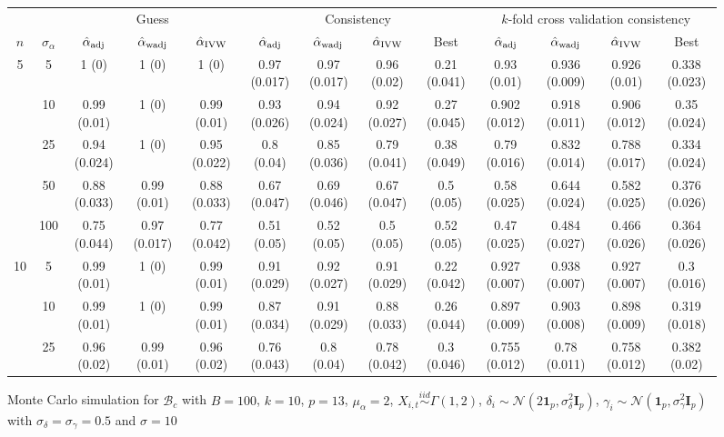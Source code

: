 \documentclass[10pt]{article}
\newcommand{\simiid}{\stackrel{iid}{\sim}} %
\def\normal#1#2{\mathcal{N}(#1,#2)} %
\def\mc#1{\mathcal{#1}} %
\theoremstyle{definition}
\begin{document}
\begin{sidewaysfigure}
\centering
\caption{Monte Carlo simulation for $\mc{B}_c$  with $B = 100$, $k = 10$, $p = 13$, $\mu_{\alpha}=2$, $X_{i,t} \simiid \Gamma(1,2)$, $\delta_i \sim \normal{2\mathbf{1}_p}{\sigma^2_{\delta}\mathbf{I}_p}$, $\gamma_i \sim \normal{\mathbf{1}_p}{\sigma^2_{\gamma}\mathbf{I}_p}$ with $\sigma_{\delta}=\sigma_{\gamma}=0.5$ and $\sigma = 10$}
\begin{tabular}{cc|ccc|cccc|cccc}
   &   & \multicolumn{3}{|c|}{Guess} & \multicolumn{4}{|c|}{Consistency}  & \multicolumn{4}{|c|}{$k$-fold cross validation consistency} \\ 
 $n$   & $\sigma_{\alpha}$ &  $\hat{\alpha}_{\rm adj}$  & $\hat{\alpha}_{\rm wadj}$ & $\hat{\alpha}_{\rm IVW}$ & $\hat{\alpha}_{\rm adj}$  & $\hat{\alpha}_{\rm wadj}$ & $\hat{\alpha}_{\rm IVW}$ &  Best & $\hat{\alpha}_{\rm adj}$  & $\hat{\alpha}_{\rm wadj}$ & $\hat{\alpha}_{\rm IVW}$ &  Best \\[.3cm]  
  \hline
  \multirow{5}{*}{5}  & 5  & 1 (0) & 1 (0) & 1 (0) & 0.97 (0.017) & 0.97 (0.017) & 0.96 (0.02) & 0.21 (0.041) & 0.93 (0.01) & 0.936 (0.009) & 0.926 (0.01) & 0.338 (0.023) \\ 
    & 10  & 0.99 (0.01) & 1 (0) & 0.99 (0.01) & 0.93 (0.026) & 0.94 (0.024) & 0.92 (0.027) & 0.27 (0.045) & 0.902 (0.012) & 0.918 (0.011) & 0.906 (0.012) & 0.35 (0.024) \\ 
    & 25  & 0.94 (0.024) & 1 (0) & 0.95 (0.022) & 0.8 (0.04) & 0.85 (0.036) & 0.79 (0.041) & 0.38 (0.049) & 0.79 (0.016) & 0.832 (0.014) & 0.788 (0.017) & 0.334 (0.024) \\ 
    & 50  & 0.88 (0.033) & 0.99 (0.01) & 0.88 (0.033) & 0.67 (0.047) & 0.69 (0.046) & 0.67 (0.047) & 0.5 (0.05) & 0.58 (0.025) & 0.644 (0.024) & 0.582 (0.025) & 0.376 (0.026) \\ 
    & 100  & 0.75 (0.044) & 0.97 (0.017) & 0.77 (0.042) & 0.51 (0.05) & 0.52 (0.05) & 0.5 (0.05) & 0.52 (0.05) & 0.47 (0.025) & 0.484 (0.027) & 0.466 (0.026) & 0.364 (0.026) \\[.3cm]  
    \multirow{5}{*}{10}  & 5  & 0.99 (0.01) & 1 (0) & 0.99 (0.01) & 0.91 (0.029) & 0.92 (0.027) & 0.91 (0.029) & 0.22 (0.042) & 0.927 (0.007) & 0.938 (0.007) & 0.927 (0.007) & 0.3 (0.016) \\ 
    & 10  & 0.99 (0.01) & 1 (0) & 0.99 (0.01) & 0.87 (0.034) & 0.91 (0.029) & 0.88 (0.033) & 0.26 (0.044) & 0.897 (0.009) & 0.903 (0.008) & 0.898 (0.009) & 0.319 (0.018) \\ 
    & 25  & 0.96 (0.02) & 0.99 (0.01) & 0.96 (0.02) & 0.76 (0.043) & 0.8 (0.04) & 0.78 (0.042) & 0.3 (0.046) & 0.755 (0.012) & 0.78 (0.011) & 0.758 (0.012) & 0.382 (0.02) \\ 

\end{tabular}
\end{sidewaysfigure}
\end{document}

